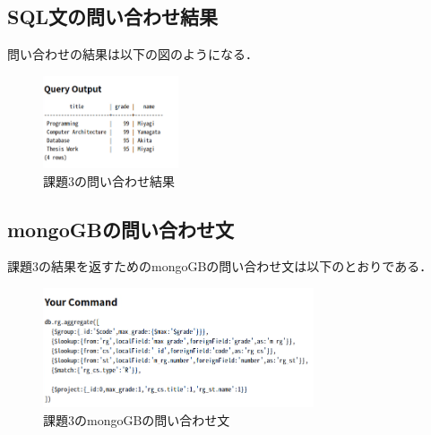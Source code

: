 \documentclass[dvipdfmx]{jarticle}
\begin{document}
\subsection{SQL文の問い合わせ結果}
問い合わせの結果は以下の図のようになる．\\
\begin{figure}[h]
    \centering
    \includegraphics[width=4cm]{sqlresult3.png}
    \caption{課題3の問い合わせ結果}
\end{figure}
\subsection{mongoGBの問い合わせ文}
課題3の結果を返すためのmongoGBの問い合わせ文は以下のとおりである．\\
\begin{figure}[h]
    \centering
    \includegraphics[width=8cm]{mongo3_code.png}
    \caption{課題3のmongoGBの問い合わせ文}
\end{figure}
\end{document}
